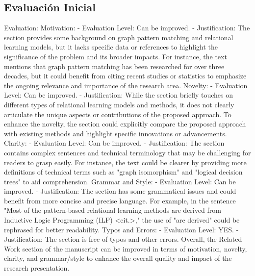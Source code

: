 \documentclass{article}%
\begin{document}
%
\subsection{Evaluación Inicial}%
\label{subsec:EvaluacinInicial}%
Evaluation:\newline%
\newline%
Motivation: \newline%
{-} Evaluation Level: Can be improved.\newline%
{-} Justification: The section provides some background on graph pattern matching and relational learning models, but it lacks specific data or references to highlight the significance of the problem and its broader impacts. For instance, the text mentions that graph pattern matching has been researched for over three decades, but it could benefit from citing recent studies or statistics to emphasize the ongoing relevance and importance of the research area.\newline%
\newline%
Novelty: \newline%
{-} Evaluation Level: Can be improved.\newline%
{-} Justification: While the section briefly touches on different types of relational learning models and methods, it does not clearly articulate the unique aspects or contributions of the proposed approach. To enhance the novelty, the section could explicitly compare the proposed approach with existing methods and highlight specific innovations or advancements.\newline%
\newline%
Clarity: \newline%
{-} Evaluation Level: Can be improved.\newline%
{-} Justification: The section contains complex sentences and technical terminology that may be challenging for readers to grasp easily. For instance, the text could be clearer by providing more definitions of technical terms such as "graph isomorphism" and "logical decision trees" to aid comprehension.\newline%
\newline%
Grammar and Style: \newline%
{-} Evaluation Level: Can be improved.\newline%
{-} Justification: The section has some grammatical issues and could benefit from more concise and precise language. For example, in the sentence "Most of the pattern{-}based relational learning methods are derived from Inductive Logic Programming (ILP) <cit.>," the use of "are derived" could be rephrased for better readability.\newline%
\newline%
Typos and Errors: \newline%
{-} Evaluation Level: YES.\newline%
{-} Justification: The section is free of typos and other errors. \newline%
\newline%
Overall, the Related Work section of the manuscript can be improved in terms of motivation, novelty, clarity, and grammar/style to enhance the overall quality and impact of the research presentation.
\end{document}

